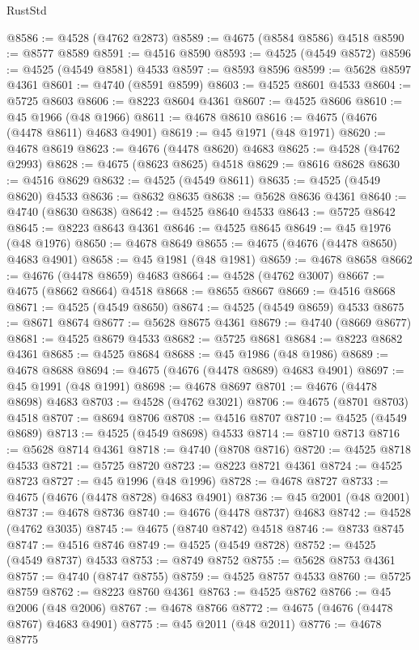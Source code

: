 \begin{lexlean}{RustStd}
\begin{coremodule}
{\begin{coremodule}
{{{{{{{{{{{{{{{{{{{{{{{{{{{{{{{{{{{{{{{{{{{{{{{{{{{{{{{{{{{{@8586 := @4528 (@4762 @2873)
@8589 := @4675 (@8584 @8586) @4518
@8590 := @8577 @8589
@8591 := @4516 @8590
@8593 := @4525 (@4549 @8572)
@8596 := @4525 (@4549 @8581) @4533
@8597 := @8593 @8596
@8599 := @5628 @8597 @4361
@8601 := @4740 (@8591 @8599)
@8603 := @4525 @8601 @4533
@8604 := @5725 @8603
@8606 := @8223 @8604 @4361
@8607 := @4525 @8606
@8610 := @45 @1966 (@48 @1966)
@8611 := @4678 @8610
@8616 := @4675 (@4676 (@4478 @8611) @4683 @4901)
@8619 := @45 @1971 (@48 @1971)
@8620 := @4678 @8619
@8623 := @4676 (@4478 @8620) @4683
@8625 := @4528 (@4762 @2993)
@8628 := @4675 (@8623 @8625) @4518
@8629 := @8616 @8628
@8630 := @4516 @8629
@8632 := @4525 (@4549 @8611)
@8635 := @4525 (@4549 @8620) @4533
@8636 := @8632 @8635
@8638 := @5628 @8636 @4361
@8640 := @4740 (@8630 @8638)
@8642 := @4525 @8640 @4533
@8643 := @5725 @8642
@8645 := @8223 @8643 @4361
@8646 := @4525 @8645
@8649 := @45 @1976 (@48 @1976)
@8650 := @4678 @8649
@8655 := @4675 (@4676 (@4478 @8650) @4683 @4901)
@8658 := @45 @1981 (@48 @1981)
@8659 := @4678 @8658
@8662 := @4676 (@4478 @8659) @4683
@8664 := @4528 (@4762 @3007)
@8667 := @4675 (@8662 @8664) @4518
@8668 := @8655 @8667
@8669 := @4516 @8668
@8671 := @4525 (@4549 @8650)
@8674 := @4525 (@4549 @8659) @4533
@8675 := @8671 @8674
@8677 := @5628 @8675 @4361
@8679 := @4740 (@8669 @8677)
@8681 := @4525 @8679 @4533
@8682 := @5725 @8681
@8684 := @8223 @8682 @4361
@8685 := @4525 @8684
@8688 := @45 @1986 (@48 @1986)
@8689 := @4678 @8688
@8694 := @4675 (@4676 (@4478 @8689) @4683 @4901)
@8697 := @45 @1991 (@48 @1991)
@8698 := @4678 @8697
@8701 := @4676 (@4478 @8698) @4683
@8703 := @4528 (@4762 @3021)
@8706 := @4675 (@8701 @8703) @4518
@8707 := @8694 @8706
@8708 := @4516 @8707
@8710 := @4525 (@4549 @8689)
@8713 := @4525 (@4549 @8698) @4533
@8714 := @8710 @8713
@8716 := @5628 @8714 @4361
@8718 := @4740 (@8708 @8716)
@8720 := @4525 @8718 @4533
@8721 := @5725 @8720
@8723 := @8223 @8721 @4361
@8724 := @4525 @8723
@8727 := @45 @1996 (@48 @1996)
@8728 := @4678 @8727
@8733 := @4675 (@4676 (@4478 @8728) @4683 @4901)
@8736 := @45 @2001 (@48 @2001)
@8737 := @4678 @8736
@8740 := @4676 (@4478 @8737) @4683
@8742 := @4528 (@4762 @3035)
@8745 := @4675 (@8740 @8742) @4518
@8746 := @8733 @8745
@8747 := @4516 @8746
@8749 := @4525 (@4549 @8728)
@8752 := @4525 (@4549 @8737) @4533
@8753 := @8749 @8752
@8755 := @5628 @8753 @4361
@8757 := @4740 (@8747 @8755)
@8759 := @4525 @8757 @4533
@8760 := @5725 @8759
@8762 := @8223 @8760 @4361
@8763 := @4525 @8762
@8766 := @45 @2006 (@48 @2006)
@8767 := @4678 @8766
@8772 := @4675 (@4676 (@4478 @8767) @4683 @4901)
@8775 := @45 @2011 (@48 @2011)
@8776 := @4678 @8775
}}}}}}}}}}}}}}}}}}}}}}}}}}}}}}}}}}}}}}}}}}}}}}}}}}}}}}}}}}}}
\end{coremodule}}
\end{coremodule}
\end{lexlean}
